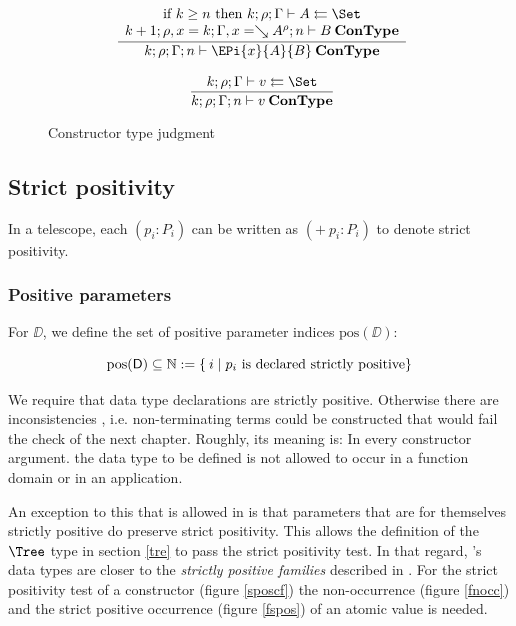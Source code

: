 \begin{figure}[htp]
\begin{gather*}
\ndru{}
{\mbox {if } k \geq n \mbox { then } \Check{k}{\rho}{\Gamma}{A}{\Set}}
{\ConType{k+1}{\ins{\rho}{x}{k}}{\ins{\Gamma}{x}{\wh \cl{A}{\rho}}}{n}{B}}
{\ConType{k}{\rho}{\Gamma}{n}{\EPi{x}{A}{B}}}
\\[2ex]
\nru{}
{\Check{k}{\rho}{\Gamma}{v}{\Set}}
{\ConType{k}{\rho}{\Gamma}{n}{v}}
\end{gather*}
\caption{Constructor type judgment}
\label{fcon}
\end{figure}

\subsection{Strict positivity}

\newcommand{\pos}{\mbox{pos}}

In a telescope, each $(p_i : P_i) $ can be written as $( + \: p_i : P_i) $ to denote strict positivity.

\subsubsection{Positive parameters}
For $\DD$, we define the set of positive parameter indices $\pos(\DD)$:

\[\pos(\DD) \subseteq \cN := \{ \: i \mid p_i \mbox{ is declared strictly positive} \}\]

We require that data type declarations are strictly positive.
Otherwise there are inconsistencies \cite{paulinmohring93inductive}, i.e. non-terminating terms could be constructed that would fail the check of the next chapter.
Roughly, its meaning is: In every constructor argument. the data type to be defined is not allowed to occur in a function domain or in an application.

An exception to this that is allowed in \mugda is that parameters that are for themselves strictly positive do preserve strict positivity. 
This allows the definition of the $\Tree$ type in section \ref{tre} to pass the strict positivity test. In that regard, \mugda 's data types are closer to the \emph{strictly positive families} described in \cite{alti:cats07}.
For the strict positivity test of a constructor (figure \ref{sposcf}) the non-occurrence (figure \ref{fnocc}) and the strict positive occurrence (figure \ref{fspos}) of an atomic value is needed.

\newcommand{\sposc}[3]{#1\vdash#2\mbox{ \textbf{sposc} }#3}
\newcommand{\spos}[3]{#1\vdash#2\mbox{ \textbf{spos} }#3}



